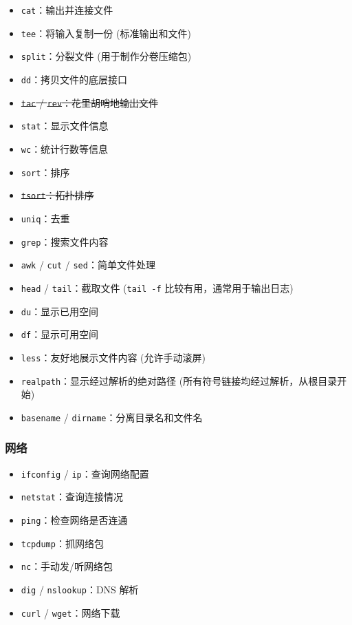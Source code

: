 \documentclass{article}
\begin{document}
	\begin{itemize}
		\itemsep0pt
		\item \texttt{cat}：输出并连接文件
		\item \texttt{tee}：将输入复制一份 (标准输出和文件)
		\item \texttt{split}：分裂文件 (用于制作分卷压缩包)
		\item \texttt{dd}：拷贝文件的底层接口
		\item \sout{\texttt{tac} / \texttt{rev}：花里胡哨地输出文件}
		\item \texttt{stat}：显示文件信息
		\item \texttt{wc}：统计行数等信息
		\item \texttt{sort}：排序
		\item \sout{\texttt{tsort}：拓扑排序}
		\item \texttt{uniq}：去重
		\item \texttt{grep}：搜索文件内容
		\item \texttt{awk} / \texttt{cut} / \texttt{sed}：简单文件处理
		\item \texttt{head} / \texttt{tail}：截取文件 (\texttt{tail -f} 比较有用，通常用于输出日志)
		\item \texttt{du}：显示已用空间
		\item \texttt{df}：显示可用空间
		\item \texttt{less}：友好地展示文件内容 (允许手动滚屏)
		\item \texttt{realpath}：显示经过解析的绝对路径 (所有符号链接均经过解析，从根目录开始)
		\item \texttt{basename} / \texttt{dirname}：分离目录名和文件名
	\end{itemize}

	\subsubsection[网络]{网络\protect\cite{lbwvssl}}

	\begin{itemize}
		\itemsep0pt
		\item \texttt{ifconfig} / \texttt{ip}：查询网络配置
		\item \texttt{netstat}：查询连接情况
		\item \texttt{ping}：检查网络是否连通
		\item \texttt{tcpdump}：抓网络包
		\item \texttt{nc}：手动发/听网络包
		\item \texttt{dig} / \texttt{nslookup}：DNS 解析
		\item \texttt{curl} / \texttt{wget}：网络下载
	\end{itemize}
\end{document}
